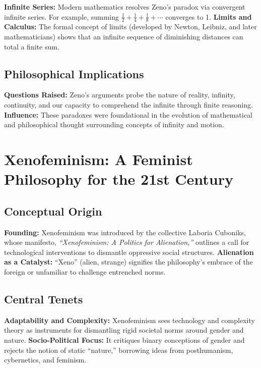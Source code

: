 \documentclass[12pt]{article}
\begin{document}
\textbf{Infinite Series:} Modern mathematics resolves Zeno’s paradox via convergent infinite series. For example, summing \( \tfrac{1}{2} + \tfrac{1}{4} + \tfrac{1}{8} + \cdots \) converges to 1.  
\textbf{Limits and Calculus:} The formal concept of limits (developed by Newton, Leibniz, and later mathematicians) shows that an infinite sequence of diminishing distances can total a finite sum.

\subsection{Philosophical Implications}

\textbf{Questions Raised:} Zeno’s arguments probe the nature of reality, infinity, continuity, and our capacity to comprehend the infinite through finite reasoning.  
\textbf{Influence:} These paradoxes were foundational in the evolution of mathematical and philosophical thought surrounding concepts of infinity and motion.

\section{Xenofeminism: A Feminist Philosophy for the 21st Century}

\subsection{Conceptual Origin}

\textbf{Founding:} Xenofeminism was introduced by the collective Laboria Cuboniks, whose manifesto, \textit{“Xenofeminism: A Politics for Alienation,”} outlines a call for technological interventions to dismantle oppressive social structures.  
\textbf{Alienation as a Catalyst:} ``Xeno'' (alien, strange) signifies the philosophy’s embrace of the foreign or unfamiliar to challenge entrenched norms.

\subsection{Central Tenets}

\textbf{Adaptability and Complexity:} Xenofeminism sees technology and complexity theory as instruments for dismantling rigid societal norms around gender and nature.  
\textbf{Socio-Political Focus:} It critiques binary conceptions of gender and rejects the notion of static ``nature,'' borrowing ideas from posthumanism, cybernetics, and feminism.
\end{document}
